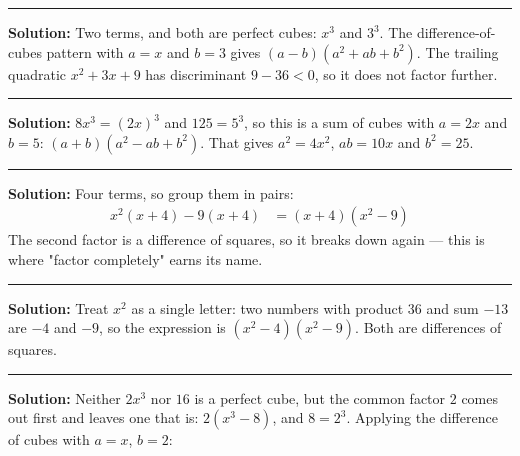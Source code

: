 \documentclass[12pt]{article}
\begin{document}



\vspace{0.3cm}
\noindent\rule{\linewidth}{0.4pt}
\vspace{0.2cm}


\textbf{Solution:} Two terms, and both are perfect cubes: $x^{3}$ and $3^{3}$.
The difference-of-cubes pattern with $a = x$ and $b = 3$ gives
$(a - b)(a^{2} + ab + b^{2})$. The trailing quadratic
$x^{2} + 3x + 9$ has discriminant $9 - 36 < 0$, so it does not factor
further. 

\vspace{0.15cm}
\noindent\rule{\linewidth}{0.2pt}


\textbf{Solution:} $8x^{3} = (2x)^{3}$ and $125 = 5^{3}$, so this is a sum of
cubes with $a = 2x$ and $b = 5$: $(a + b)(a^{2} - ab + b^{2})$. That gives
$a^{2} = 4x^{2}$, $ab = 10x$ and $b^{2} = 25$.

\vspace{0.15cm}
\noindent\rule{\linewidth}{0.2pt}


\textbf{Solution:} Four terms, so group them in pairs:
\begin{align*}
  x^{2}(x + 4) - 9(x + 4) &= (x + 4)(x^{2} - 9)
\end{align*}
The second factor is a difference of squares, so it breaks down again --- this
is where "factor completely" earns its name. 

\vspace{0.15cm}
\noindent\rule{\linewidth}{0.2pt}


\textbf{Solution:} Treat $x^{2}$ as a single letter: two numbers with product
$36$ and sum $-13$ are $-4$ and $-9$, so the expression is
$(x^{2} - 4)(x^{2} - 9)$. Both are differences of squares.

\vspace{0.15cm}
\noindent\rule{\linewidth}{0.2pt}


\textbf{Solution:} Neither $2x^{3}$ nor $16$ is a perfect cube, but the common
factor $2$ comes out first and leaves one that is:
$2(x^{3} - 8)$, and $8 = 2^{3}$. Applying the difference of cubes with
$a = x$, $b = 2$: 
\end{document}
